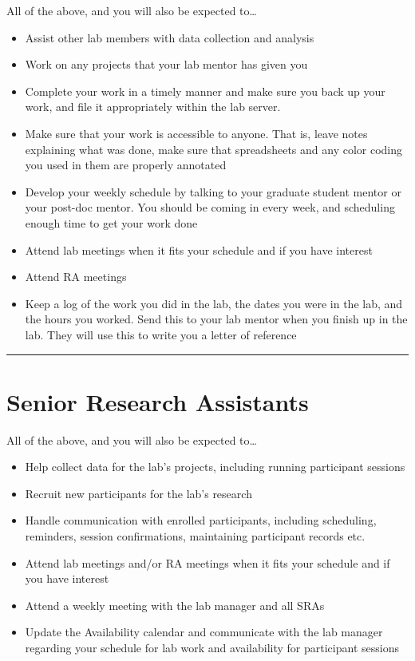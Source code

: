 \documentclass[
]{book}
\providecommand{\tightlist}{%
  \setlength{\itemsep}{0pt}\setlength{\parskip}{0pt}}
\begin{document}
All of the above, and you will also be expected to\ldots{}

\begin{itemize}
\tightlist
\item
  Assist other lab members with data collection and analysis
\item
  Work on any projects that your lab mentor has given you
\item
  Complete your work in a timely manner and make sure you back up your work, and file it appropriately within the lab server.
\item
  Make sure that your work is accessible to anyone. That is, leave notes explaining what was done, make sure that spreadsheets and any color coding you used in them are properly annotated
\item
  Develop your weekly schedule by talking to your graduate student mentor or your post-doc mentor. You should be coming in every week, and scheduling enough time to get your work done
\item
  Attend lab meetings when it fits your schedule and if you have interest
\item
  Attend RA meetings
\item
  Keep a log of the work you did in the lab, the dates you were in the lab, and the hours you worked. Send this to your lab mentor when you finish up in the lab. They will use this to write you a letter of reference
\end{itemize}

\begin{center}\rule{0.5\linewidth}{0.5pt}\end{center}

\hypertarget{senior-research-assistants}{%
\section{Senior Research Assistants}\label{senior-research-assistants}}

All of the above, and you will also be expected to\ldots{}

\begin{itemize}
\tightlist
\item
  Help collect data for the lab's projects, including running participant sessions
\item
  Recruit new participants for the lab's research
\item
  Handle communication with enrolled participants, including scheduling, reminders, session confirmations, maintaining participant records etc.
\item
  Attend lab meetings and/or RA meetings when it fits your schedule and if you have interest
\item
  Attend a weekly meeting with the lab manager and all SRAs
\item
  Update the Availability calendar and communicate with the lab manager regarding your schedule for lab work and availability for participant sessions
\end{itemize}
\end{document}
